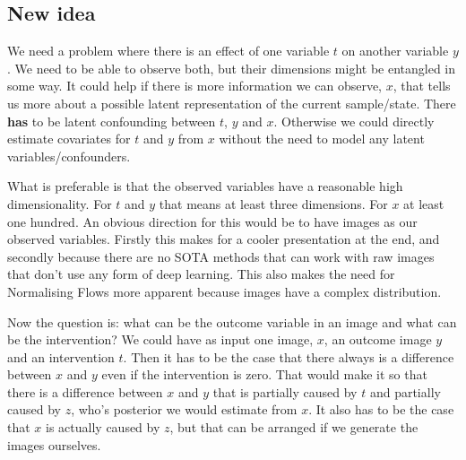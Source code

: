 \documentclass{article}
\begin{document}


\subsection{New idea}
We need a problem where there is an effect of one variable $t$ on another variable $y$. We need to be able to observe both, but their dimensions might be entangled in some way. It could help if there is more information we can observe, $x$, that tells us more about a possible latent representation of the current sample/state. There \textbf{has} to be latent confounding between $t$, $y$ and $x$. Otherwise we could directly estimate covariates for $t$ and $y$ from $x$ without the need to model any latent variables/confounders. 

What is preferable is that the observed variables have a reasonable high dimensionality. For $t$ and $y$ that means at least three dimensions. For $x$ at least one hundred. An obvious direction for this would be to have images as our observed variables. Firstly this makes for a cooler presentation at the end, and secondly because there are no SOTA methods that can work with raw images that don't use any form of deep learning. This also makes the need for Normalising Flows more apparent because images have a complex distribution.

Now the question is: what can be the outcome variable in an image and what can be the intervention? We could have as input one image, $x$, an outcome image $y$ and an intervention $t$. Then it has to be the case that there always is a difference between $x$ and $y$ even if the intervention is zero. That would make it so that there is a difference between $x$ and $y$ that is partially caused by $t$ and partially caused by $z$, who's posterior we would estimate from $x$. It also has to be the case that $x$ is actually caused by $z$, but that can be arranged if we generate the images ourselves. 
\end{document}
